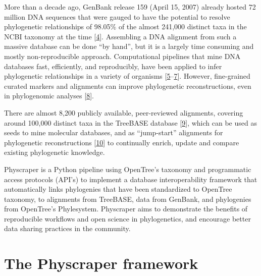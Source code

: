 \documentclass[]{article}
\begin{document}
More than a decade ago, GenBank release 159 (April 15, 2007) already hosted 72 million DNA sequences that were gauged to have the potential to resolve phylogenetic relationships of 98.05\% of the almost 241,000 distinct taxa in the NCBI taxonomy at the time {[}\protect\hyperlink{ref-sanderson2008phylota}{4}{]}. Assembling a DNA alignment from such a massive database can be done ``by hand'', but it is a largely time consuming and mostly non-reproducible approach. Computational pipelines that mine DNA databases fast, efficiently, and reproducibly, have been applied to infer phylogenetic relationships in a variety of organisms {[}\protect\hyperlink{ref-smith2009mega}{5}--\protect\hyperlink{ref-izquierdo2014pumper}{7}{]}.
However, fine-grained curated markers and alignments can improve phylogenetic reconstructions, even in phylogenomic analyses {[}\protect\hyperlink{ref-fragoso2017pilot}{8}{]}.

There are almost 8,200 publicly available, peer-reviewed alignments, covering around 100,000 distinct taxa in the TreeBASE database {[}\protect\hyperlink{ref-piel2009treebase}{9}{]}, which can be used as seeds to mine molecular databases, and as ``jump-start'' alignments for phylogenetic reconstructions {[}\protect\hyperlink{ref-morrison2006multiple}{10}{]} to continually enrich, update and compare existing phylogenetic knowledge.

Physcraper is a Python pipeline using OpenTree's taxonomy and programmatic access protocols (API's) to implement a database interoperability framework that automatically links phylogenies that have been standardized to OpenTree taxonomy, to alignments from TreeBASE, data from GenBank, and phylogenies from OpenTree's Phylesystem.
Physcraper aims to demonstrate the benefits of reproducible workflows and open science in phylogenetics, and encourage better data sharing practices in the community.

\hypertarget{the-physcraper-framework}{%
\section{The Physcraper framework}\label{the-physcraper-framework}}
\end{document}
